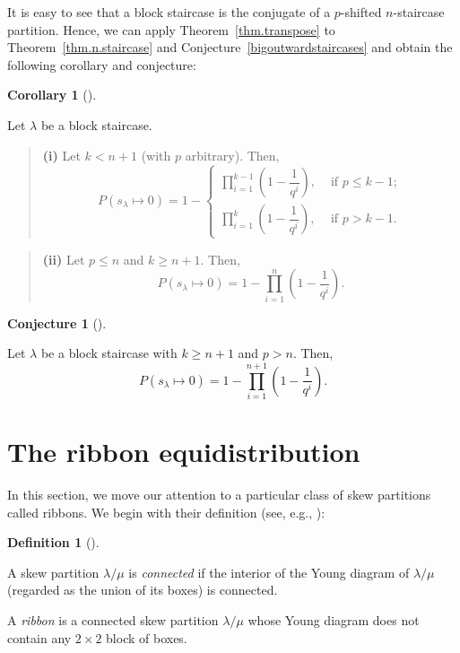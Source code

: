 \documentclass[numbers=enddot,12pt,final,onecolumn,notitlepage]{scrartcl}%
\theoremstyle{definition}
\newtheorem{defi}[theo]{Definition}
\newenvironment{definition}[1][]
{\begin{defi}[#1]\begin{leftbar}}
{\end{leftbar}\end{defi}}
\newtheorem{coro}[theo]{Corollary}
\newenvironment{corollary}[1][]
{\begin{coro}[#1]\begin{leftbar}}
{\end{leftbar}\end{coro}}
\newtheorem{conj}[theo]{Conjecture}
\newenvironment{conjecture}[1][]
{\begin{conj}[#1]\begin{leftbar}}
{\end{leftbar}\end{conj}}
\newenvironment{statement}{\begin{quote}}{\end{quote}}
\let\prodnonlimits\prod
\renewcommand{\prod}{\prodnonlimits\limits}
\renewcommand{\leq}{\leqslant}
\renewcommand{\geq}{\geqslant}
\theoremstyle{plainsl}
\begin{document}
It is easy to see that a block staircase is the conjugate of a $p$-shifted $n$-staircase partition.
Hence, we can apply Theorem~\ref{thm.transpose} to Theorem~\ref{thm.n.staircase} and Conjecture~\ref{bigoutwardstaircases}
and obtain the following corollary and conjecture:
\begin{corollary}
\label{crl.n.staircase}

Let $\lambda$ be a block staircase.

\begin{statement}
\textbf{(i)} Let $k < n+1$ (with $p$ arbitrary). Then,
\[
P(s_{\lambda} \longmapsto 0) =
1 -
\begin{cases}
\prod_{i=1}^{k-1} \left(  1-\dfrac{1}{q^{i}}\right) ,
& \text{ if } p \leq k-1; \\
\prod_{i=1}^{k} \left(  1-\dfrac{1}{q^{i}}\right) ,
& \text{ if } p > k-1.
\end{cases}
\]
\end{statement}
 
\begin{statement}
\textbf{(ii)} Let $p \leq n$ and $k \geq n+1$. Then, 
\[
P(s_{\lambda} \longmapsto 0) = 1- \prod_{i=1}^{n} \left(  1-\dfrac{1}{q^{i}}\right) .
\]
\end{statement}
\end{corollary}

\begin{conjecture}
\label{bigoutwardblockstaircases}
Let $\lambda$ be a block staircase with $k \geq n+1$ and $p > n$.  Then,
\[
P(s_{\lambda} \longmapsto 0) = 1-\prod_{i=1}^{n+1} \left(  1-\dfrac{1}{q^{i}}\right).
\]
\end{conjecture}

\section{The ribbon equidistribution}

In this section, we move our attention to a particular class of skew partitions called ribbons. We begin with their definition (see, e.g., {\cite[\S7.17]{EC2}}):

\begin{definition}
A skew partition $\lambda/\mu$ is \emph{connected} if the interior of the Young diagram of $\lambda/\mu$ (regarded as the union of its boxes) is connected.

A \emph{ribbon} is a connected skew partition $\lambda/\mu$ whose Young diagram does not contain any $2 \times 2$ block of boxes. 
\end{definition}
\end{document}
